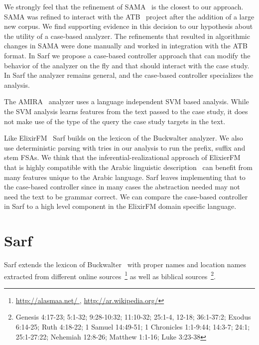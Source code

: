 \documentclass[11pt,letterpaper]{article}
\begin{document}

We strongly feel that the refinement of SAMA~\cite{Maamouri:10} 
is the closest to our approach. SAMA was refined to interact with
the ATB~\cite{Maamouri:04} project after the addition of a large 
new corpus. We find supporting evidence in this decision to our hypothesis
about the utility of a case-based analyzer. 
The refinements that resulted in algorithmic changes in SAMA were 
done manually and worked in integration with the ATB format. 
In Sarf we propose a case-based controller approach that can modify 
the behavior of the analyzer on the fly and that should interact
with the case study. In Sarf the analyzer remains general, and the 
case-based controller specializes the analysis.

The AMIRA~\cite{Diab:07} analyzer uses 
a language independent SVM based analysis. 
While the SVM analysis learns features from the text passed to the case
study, it does not make use of the type of the query the 
case study targets in the text. 

Like ElixirFM~\cite{Otakar:07} Sarf builds on the lexicon
of the Buckwalter analyzer. 
We also use deterministic parsing with tries in our analysis 
to run the prefix, suffix and stem FSAs. 
We think that the inferential-realizational approach 
of ElixierFM
that is highly compatible with the Arabic linguistic 
description~\cite{Badawi:04}
can benefit from many features unique to the Arabic language.
Sarf leaves implementing that to the case-based controller
since in many cases the abstraction needed may not need the 
text to be grammar correct.
We can compare the case-based controller in Sarf to a high level
component in the ElixirFM domain specific language. 

\section{Sarf}
\label{sec:sarf}

Sarf extends the lexicon of Buckwalter~ with 
proper names and location names extracted from different online 
sources~\footnote{\href{http://alasmaa.net/}{http://alasmaa.net/ }, 
\href{http://ar.wikipedia.org/}{http://ar.wikipedia.org/}}
as well as biblical sources~\footnote{Genesis 4:17-23; 5:1-32; 9:28-10:32; 11:10-32; 25:1-4, 12-18; 36:1-37:2; Exodus 6:14-25; Ruth 4:18-22; 1 Samuel 14:49-51; 1 Chronicles 1:1-9:44; 14:3-7; 24:1; 25:1-27:22; Nehemiah 12:8-26; Matthew 1:1-16; Luke 3:23-38}.
\end{document}
